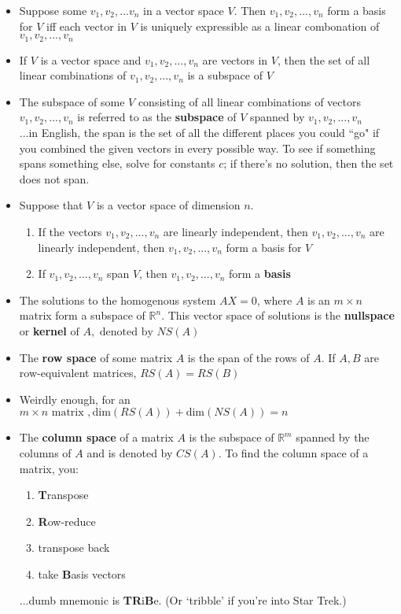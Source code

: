 \documentclass[10pt,letterpaper]{article}
\begin{document}
\begin{itemize}
\item Suppose some $v_1, v_2,...v_n$ in a vector space $V$. Then $v_1, v_2,...,v_n$ form a basis for $V$ iff each vector in $V$ is uniquely expressible as a linear combonation of $v_1,v_2,...,v_n$

\item If $V$ is a vector space and $v_1, v_2, ...,v_n$ are vectors in $V$, then the set of all linear combinations of $v_1, v_2,...,v_n$ is a subspace of $V$ 

\item The subspace of some $V$ consisting of all linear combinations of vectors $v_1, v_2,...,v_n$ is referred to as the \textbf{subspace} of $V$ spanned by $v_1, v_2,...,v_n$ \\
...in English, the span is the set of all the different places you could ``go" if you combined the given vectors in every possible way. To see if something spans something else, solve for constants $c$; if there's no solution, then the set does not span. 

\item Suppose that $V$ is a vector space of dimension $n$. 
\begin{enumerate}
\item If the vectors $v_1,v_2,...,v_n$ are linearly independent, then $v_1,v_2, ...,v_n$ are linearly independent, then $v_1,v_2, ...,v_n$  form a basis for $V$

\item If $v_1,v_2, ...,v_n$ span $V$, then $v_1,v_2, ...,v_n$ form a \textbf{basis}
\end{enumerate}

\item The solutions to the homogenous system $AX=0$, where $A$ is an $m\times n$ matrix form a subspace of $\mathbb{R}^n$. This vector space of solutions is the \textbf{nullspace} or \textbf{kernel}$\mbox{ of } A, \mbox{ denoted by } NS(A)$

\item The \textbf{row space} of some matrix $A$ is the span of the rows of $A$. If $A, B$ are row-equivalent matrices, $RS(A)=RS(B)$

\item Weirdly enough, for an $m\times n \mbox{ matrix },\mbox{dim}(RS(A))+\mbox{dim}(NS(A))=n$

\item The \textbf{column space} of a matrix $A$ is the subspace of $\mathbb{R}^m$ spanned by the columns of $A$ and is denoted by $CS(A)$. To find the column space of a matrix, you: 
\begin{enumerate}
\item \textbf{T}ranspose 
\item \textbf{R}ow-reduce
\item transpose back 
\item take \textbf{B}asis vectors 
\end{enumerate}
...dumb mnemonic is \textbf{TR}i\textbf{B}e. (Or `tribble' if you're into Star Trek.) 


\end{itemize}
\end{document}
